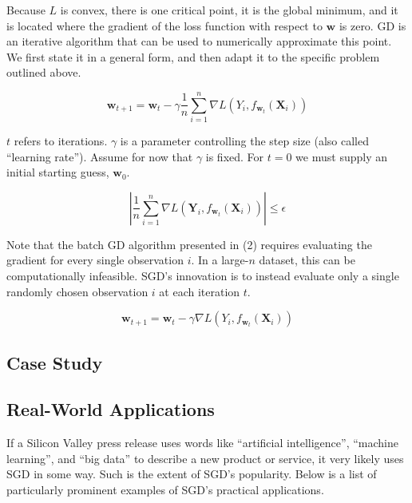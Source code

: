 \documentclass{article}
\begin{document}
Because $L$ is convex, there is one critical point,
it is the global minimum, and it is located where the gradient of the loss
function with respect to $\bm{w}$ is zero. GD is an iterative
algorithm that can be used to numerically approximate this point. We first state
it in a general form, and then adapt it to the specific problem outlined above.

\begin{equation}
	\bm{w}_{t+1} = \bm{w}_t - \gamma \frac{1}{n}\sum_{i=1}^n
	\nabla L(Y_i, f_{\bm{w}_t}(\bm{X}_i))
\end{equation}

$t$ refers to iterations. $\gamma$ is a parameter controlling the step
size (also called ``learning rate''). Assume for now that $\gamma$ is fixed. For
$t=0$ we must supply an initial starting guess, $\bm{w}_0$.  

\begin{equation}
	\left|\frac{1}{n}\sum_{i=1}^n \nabla L(\bm{Y}_i,
	f_{\bm{w}_t}(\bm{X}_i))\right| \leq \epsilon
\end{equation}

Note that the batch GD algorithm presented in (2) requires evaluating the
gradient for every single observation $i$. In a large-$n$ dataset, this can be
computationally infeasible. SGD's innovation is to instead evaluate only a
single randomly chosen observation $i$ at each iteration $t$.

\begin{equation}
	\bm{w}_{t+1} = \bm{w}_t - \gamma 
	\nabla L(Y_i, f_{\bm{w}_t}(\bm{X}_i))
\end{equation}

\subsection{Case Study}

\cite{dal2015calibrating}

\subsection{Real-World Applications}

If a Silicon Valley press release uses words like ``artificial intelligence'',
``machine learning'', and ``big data'' to describe a new product or service, it very likely
uses SGD in some way. Such is the extent of SGD's popularity. 
Below is a list of particularly prominent examples of SGD's practical
applications.
\end{document}
